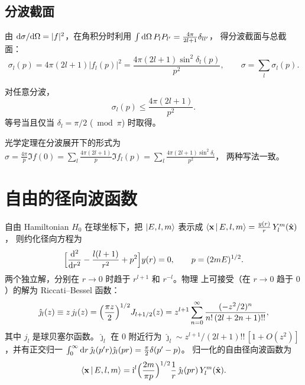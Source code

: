 \subsection{分波截面}

由 $\mathrm{d}\sigma/\mathrm{d}\Omega = |f|^2$，在角积分时利用
$\int\mathrm{d}\Omega\,P_l P_{l'}=\frac{4\pi}{2l+1}\delta_{ll'}$，
得分波截面与总截面：
\begin{equation}\label{eq:sigma-l}
\sigma_l(p)
= 4\pi(2l+1)|f_l(p)|^2
= \frac{4\pi(2l+1)\sin^2\delta_l(p)}{p^2},
\qquad
\sigma=\sum_l\sigma_l(p).
\end{equation}

\begin{theorem}\label{thm:unitary-bound}
对任意分波，
\begin{equation}
\sigma_l(p)\le \frac{4\pi(2l+1)}{p^2}.
\end{equation}
等号当且仅当 $\delta_l=\pi/2$ ($\bmod\pi$) 时取得。
\end{theorem}

\begin{remark}
光学定理在分波展开下的形式为
$\sigma=\frac{4\pi}{p}\Im f(0)
=\sum_l\frac{4\pi(2l+1)}{p}\Im f_l(p)
=\sum_l\frac{4\pi(2l+1)\sin^2\delta_l}{p^2}$，
两种写法一致。
\end{remark}

\section{自由的径向波函数}\label{sec:free-radial}

自由 Hamiltonian $H_0$ 在球坐标下，把 $\ket{E,l,m}$
表示成
$\left\langle \mathbf x \,\middle|\, E,l,m \right\rangle= \frac{y(r)}{r}\,Y_l^m(\hat{\mathbf x})$，
则约化径向方程为
\begin{equation}\label{eq:radial-free}
\Bigl[\frac{\mathrm{d}^2}{\mathrm{d} r^2}-\frac{l(l+1)}{r^2}+p^2\Bigr]y(r)=0,
\qquad p=(2mE)^{1/2}.
\end{equation}
两个独立解，分别在 $r\to 0$ 时趋于 $r^{l+1}$ 和 $r^{-l}$。物理
上可接受（在 $r\to0$ 趋于 $0$）的解为 Riccati--Bessel 函数：
\begin{equation}\label{eq:RBessel}
\hat\jmath_l(z)\equiv z\,j_l(z)
= \Bigl(\frac{\pi z}{2}\Bigr)^{1/2}J_{l+1/2}(z)
= z^{l+1}\sum_{n=0}^\infty \frac{(-z^2/2)^n}{n!\,(2l+2n+1)!!},
\end{equation}
其中 $j_l$ 是球贝塞尔函数。$\hat\jmath_l$ 在 $0$ 附近行为
$\hat\jmath_l\sim z^{l+1}/(2l+1)!!\,[1+O(z^2)]$，并有正交归一
$\int_0^\infty\mathrm{d} r\,\hat\jmath_l(p'r)\hat\jmath_l(pr)
=\frac{\pi}{2}\delta(p'-p)$。
归一化的自由径向波函数为
\begin{equation}\label{eq:free-Elm-x}
\left\langle \mathbf x \,\middle|\, E,l,m \right\rangle
= \mathrm{i}^l\Bigl(\frac{2m}{\pi p}\Bigr)^{1/2}
   \frac{1}{r}\,\hat\jmath_l(pr)\,Y_l^m(\hat{\mathbf x}).
\end{equation}

